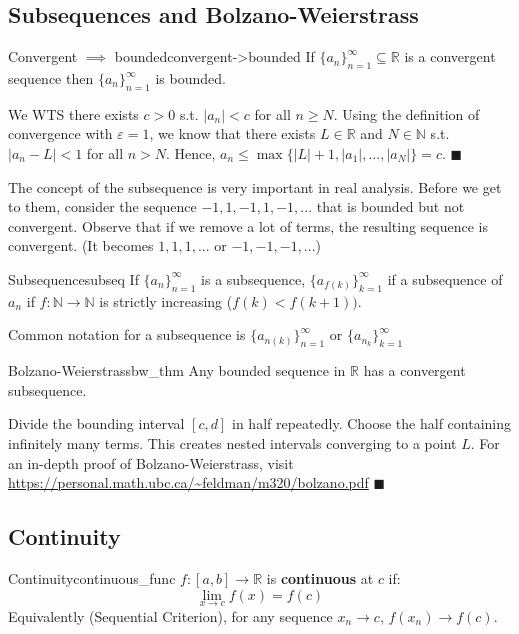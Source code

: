\documentclass[11pt, letterpaper, openany]{book}
\renewenvironment{proof}[1][\proofname]{%
  \tcolorbox[blanker, breakable, left=1em,
    before skip=1em, after skip=1em,
    borderline west={2pt}{0pt}{MagicTeal!50},
    colback=MagicCream,
    before upper={\textcolor{MagicTeal}{\sffamily\bfseries #1.}\space}
  ]%
}{%
  \hfill\textcolor{MagicTeal}{\ensuremath{\blacksquare}}\endtcolorbox%
}
\begin{document}
\subsection{Subsequences and Bolzano-Weierstrass}

\begin{thm}{Convergent $\implies$ bounded}{convergent->bounded}
    If $\{a_n\}_{n=1}^\infty\subseteq\mathbb{R}$ is a convergent sequence then $\{a_n\}_{n=1}^\infty$ is bounded. 
\end{thm}
\begin{proof}
    We WTS there exists $c>0$ s.t. $|a_n|<c$ for all $n\geq{N}$. Using the definition of convergence with $\varepsilon=1$, we know that there exists $L\in\mathbb{R}$ and $N\in{\mathbb{N}}$ s.t. $|a_n-L|<1$ for all $n>N$. Hence, $a_n\leq\max\{|L|+1,|a_1|,...,|a_N|\}=c$. 
\end{proof}
\begin{remark}
    The concept of the subsequence is very important in real analysis. Before we get to them, consider the sequence $-1,1,-1,1,-1,...$ that is bounded but not convergent. Observe that if we remove a lot of terms, the resulting sequence is convergent. (It becomes $1,1,1,...$ or $-1,-1,-1,...$)
\end{remark}


\begin{defn}{Subsequence}{subseq}
If $\{a_n\}^\infty_{n=1}$ is a subsequence, $\{a_{f(k)}\}^\infty_{k=1}$ if a subsequence of $a_n$ if $f:\mathbb{N}\to\mathbb{N}$ is strictly increasing ($f(k)<f(k+1))$. 
\end{defn}
\begin{remark}
    Common notation for a subsequence is $\{a_{n(k)}\}^\infty_{n=1}$ or $\{a_{n_k}\}_{k=1}^\infty$
\end{remark}

\begin{thm}{Bolzano-Weierstrass}{bw_thm}
Any bounded sequence in $\mathbb{R}$ has a convergent subsequence.
\end{thm}

\begin{proof}[Sketch]
Divide the bounding interval $[c,d]$ in half repeatedly. Choose the half containing infinitely many terms. This creates nested intervals converging to a point $L$. For an in-depth proof of Bolzano-Weierstrass, visit \url{https://personal.math.ubc.ca/~feldman/m320/bolzano.pdf}
\end{proof}

\subsection{Continuity}
\begin{defn}{Continuity}{continuous_func}
$f: [a,b] \to \mathbb{R}$ is \textbf{continuous} at $c$ if:
\[ \lim_{x \to c} f(x) = f(c) \]
Equivalently (Sequential Criterion), for any sequence $x_n \to c$, $f(x_n) \to f(c)$.
\end{defn}
\end{document}
